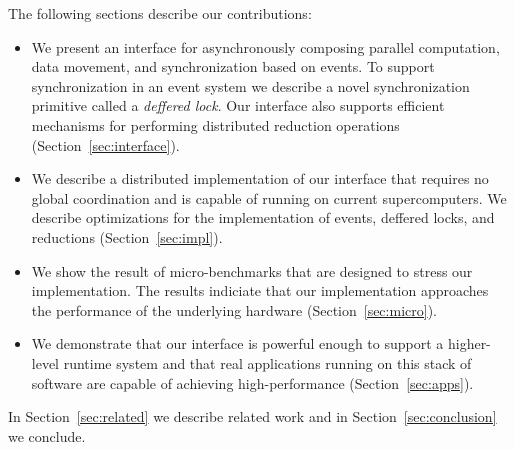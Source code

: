 The following sections describe our contributions:
\begin{itemize}
\item We present an interface for asynchronously composing
parallel computation, data movement, and synchronization based on events.  
To support synchronization in an event system we describe a novel synchronization
primitive called a {\em deffered lock}.  Our interface also supports efficient
mechanisms for performing distributed reduction operations (Section~\ref{sec:interface}).

\item We describe a distributed implementation of our interface that requires no
global coordination and is capable of running on current supercomputers.  We
describe optimizations for the implementation of events, deffered locks, and
reductions (Section~\ref{sec:impl}).

\item We show the result of micro-benchmarks that are designed to stress
our implementation.  The results indiciate that our implementation approaches the performance of
the underlying hardware (Section~\ref{sec:micro}).

\item We demonstrate that our interface is powerful enough to support a higher-level
runtime system and that real applications running on this stack of software
are capable of achieving high-performance (Section~\ref{sec:apps}).
\end{itemize}

In Section~\ref{sec:related} we describe related work and in Section~\ref{sec:conclusion}
we conclude.

